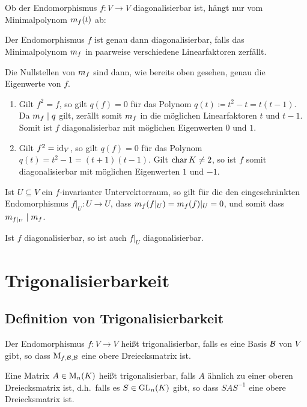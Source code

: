 Ob der Endomorphismus $f \colon V \to V$ diagonalisierbar ist, hängt nur vom Minimalpolynom $m_{f}(t)$ ab:

\begin{proposition}
  Der Endomorphismus $f$ ist genau dann diagonalisierbar, falls das Minimalpolynom $m_{f}$ in paarweise verschiedene Linearfaktoren zerfällt.
\end{proposition}

Die Nullstellen von $m_{f}$ sind dann, wie bereits oben gesehen, genau die Eigenwerte von $f$.

\begin{example}
  \leavevmode
  \begin{enumerate}
    \item
      Gilt $f^2 = f$, so gilt $q(f) = 0$ für das Polynom $q(t) \coloneqq t^2 - t = t(t-1)$.
      Da $m_{f} \mid q$ gilt, zerällt somit $m_{f}$ in die möglichen Linearfaktoren $t$ und $t-1$.
      Somit ist $f$ diagonalisierbar mit möglichen Eigenwerten $0$ und $1$.
    \item
      Gilt $f^2 = \operatorname{id}_V$, so gilt $q(f) = 0$ für das Polynom $q(t) = t^2 - 1 = (t+1)(t-1)$.
      Gilt $\operatorname{char} K \neq 2$, so ist $f$ somit diagonalisierbar mit möglichen Eigenwerten $1$ und $-1$.
  \end{enumerate}
\end{example}

Ist $U \subseteq V$ ein $f$-invarianter Untervektorraum, so gilt für die den eingeschränkten Endomorphismus $f|_U \colon U \to U$, dass $m_{f}(f|_U) = m_{f}(f)|_U = 0$, und somit dass $m_{f|_U} \mid m_{f}$.

\begin{corollary}
  Ist $f$ diagonalisierbar, so ist auch $f|_U$ diagonalisierbar.
\end{corollary}





\section{Trigonalisierbarkeit}



\subsection{Definition von Trigonalisierbarkeit}

\begin{definition}
  Der Endomorphismus $f \colon V \to V$ heißt trigonalisierbar, falls es eine Basis $\mathcal{B}$ von $V$ gibt, so dass $\operatorname{M}_{f, \mathcal{B}, \mathcal{B}}$ eine obere Dreiecksmatrix ist.
  
  Eine Matrix $A \in \operatorname{M}_{n}(K)$ heißt trigonalisierbar, falls $A$ ähnlich zu einer oberen Dreiecksmatrix ist, d.h.\ falls es $S \in \operatorname{GL}_{n}(K)$ gibt, so dass $S A S^{-1}$ eine obere Dreiecksmatrix ist.
\end{definition}

